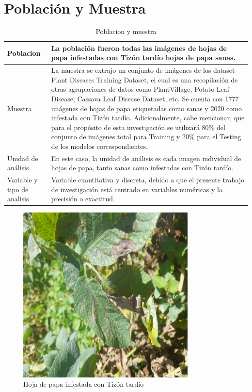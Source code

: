 \section{Población y Muestra }

\begin{table}[H]
	\centering
	\caption{Poblacion y muestra }
	\label{tabla-2x4}
	\begin{tabular}{|p{3cm}|p{9cm}|}
		\hline
		Poblacion &  La población fueron todas las imágenes de hojas de papa infestadas con Tizón tardío hojas de papa sanas.  \\ \hline
		Muestra &  La muestra se extrajo un conjunto de imágenes de los dataset Plant Diseases Training Dataset, el cual es una recopilación de otras agrupaciones de datos como PlantVillage, Potato Leaf Disease, Cassava Leaf Disease Dataset, etc. Se cuenta con 1777 imágenes de hojas de papa etiquetadas como sanas y 2020 como infestada con Tizón tardío. Adicionalmente, cabe mencionar, que para el propósito de esta investigación se utilizará 80\% del conjunto de imágenes total para Training y 20\% para el Testing de los modelos correspondientes.\\ \hline
		Unidad de análisis &  En este caso, la unidad de análisis es cada imagen individual de hojas de papa, tanto sanas como infestadas con Tizón tardío. \\ \hline
		Variable y tipo de analisis & Variable cuantitativa y discreta, debido a que el presente trabajo de
		investigación está centrado en variables numéricas y la precisión o
		exactitud. \\ \hline
	\end{tabular}
\end{table}


\begin{figure}[H]
	\begin{center}
		\includegraphics[width=0.8\textwidth]{3/figures/img.jpg}
		\caption{Hoja de papa infestada con Tizón tardío}
		\label{fig1}
	\end{center}
	
\end{figure}

